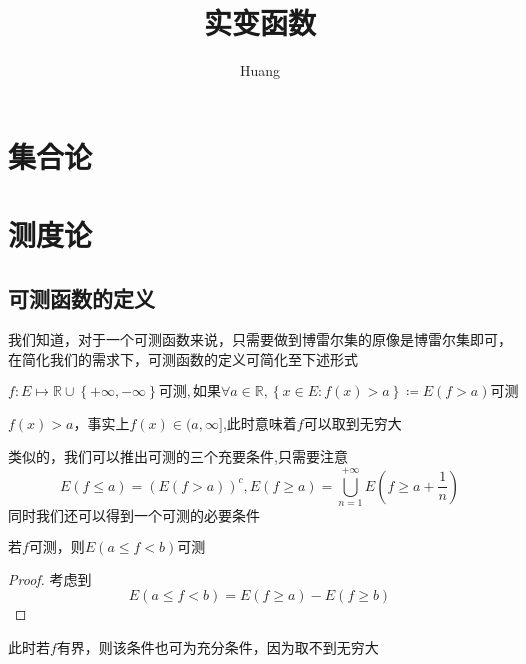 \documentclass[lang=cn,14pt]{elegantbook}
\title{实变函数}
\author{ Huang}
\begin{document}
	
	\maketitle
	\frontmatter
	
	\tableofcontents
	
	\mainmatter
	\chapter{集合论}
	\chapter{测度论}
	\section{可测函数的定义}
		我们知道，对于一个可测函数来说，只需要做到博雷尔集的原像是博雷尔集即可，在简化我们的需求下，可测函数的定义可简化至下述形式
	\begin{definition}[可测函数]
		$f:E\longmapsto \mathbb{R} \cup \left\{ +\infty ,-\infty \right\} \text{可测},\text{如果}\forall a\in \mathbb{R} ,\left\{ x\in E:f\left( x \right) >a \right\} \coloneqq E\left( f>a \right) \text{可测}
		$
	\end{definition}
	\begin{remark}
		$f(x)>a$，事实上$f(x)\in (a,\infty]$,此时意味着$f$可以取到无穷大
	\end{remark}
	类似的，我们可以推出可测的三个充要条件,只需要注意
\begin{equation*}
	E\left( f\le a \right) =\left( E\left( f>a \right) \right) ^c,E\left( f\ge a \right) =\bigcup_{n=1}^{+\infty}{E\left( f\ge a+\frac{1}{n} \right)}
\end{equation*}
同时我们还可以得到一个可测的必要条件
\begin{theorem}
	$\text{若}f\text{可测，则}E\left( a\le f<b \right) \text{可测}$
\end{theorem}
\begin{proof}
	考虑到
	\begin{equation*}
		E\left( a\le f<b \right) =E(f\ge a)-E(f\ge b)
	\end{equation*}
\end{proof}
\begin{remark}
	此时若$f$有界，则该条件也可为充分条件，因为取不到无穷大
\end{remark}
\end{document}
